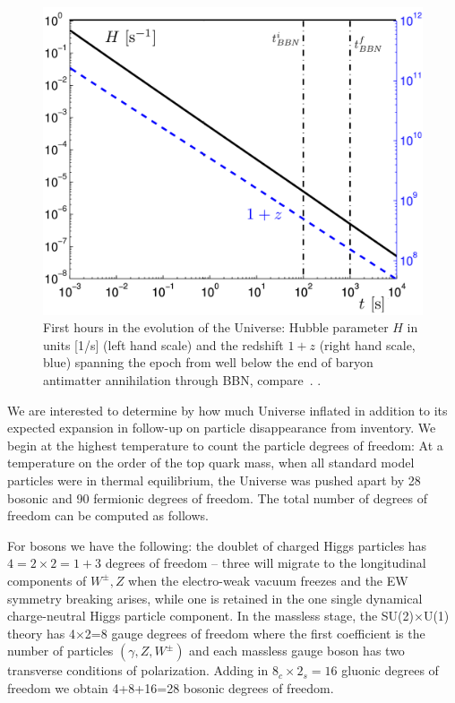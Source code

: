 \begin{figure}
\centerline{\includegraphics[width=0.90\linewidth]{01-introduction/Figures/HzBBN.png}} 
\caption{First hours in the evolution of the Universe: Hubble parameter $H$ in units [1/s] (left hand scale) and the redshift $1+z$ (right hand scale, blue) spanning the epoch from well below the end of baryon antimatter annihilation through BBN, compare~. . } \label{fig:BBN1}
\end{figure}

We are interested to determine by how much Universe inflated in addition to its expected expansion in follow-up on particle disappearance from inventory. We begin at the highest temperature to count the particle degrees of freedom: At a temperature on the order of the top quark mass, when all standard model particles were in thermal equilibrium, the Universe was pushed apart by 28 bosonic and 90 fermionic degrees of freedom. The total number of degrees of freedom can be computed as follows. 

For bosons we have the following: the doublet of charged Higgs particles has $4=2\times2=1+3$ degrees of freedom -- three will migrate to the longitudinal components of $W^\pm, Z$ when the electro-weak vacuum freezes and the EW symmetry breaking arises, while one is retained in the one single dynamical charge-neutral Higgs particle component. In the massless stage, the SU(2)$\times$U(1) theory has 4$\times$2=8 gauge degrees of freedom where the first coefficient is the number of particles $(\gamma, Z, W^\pm)$ and each massless gauge boson has two transverse conditions of polarization. Adding in $8_c\times2_s=16$ gluonic degrees of freedom we obtain 4+8+16=28 bosonic degrees of freedom. 

